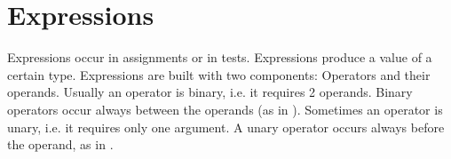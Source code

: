 %
%
%
%
%
%
%
%
%

\chapter{Expressions}
\label{ch:Expressions}
Expressions occur in assignments or in tests. Expressions produce a value
of a certain type.
Expressions are built with two components: Operators and their operands.
Usually an operator is binary, i.e. it requires 2 operands. Binary operators
occur always between the operands (as in ). Sometimes an
operator is unary, i.e. it requires only one argument. A unary operator
occurs always before the operand, as in .

